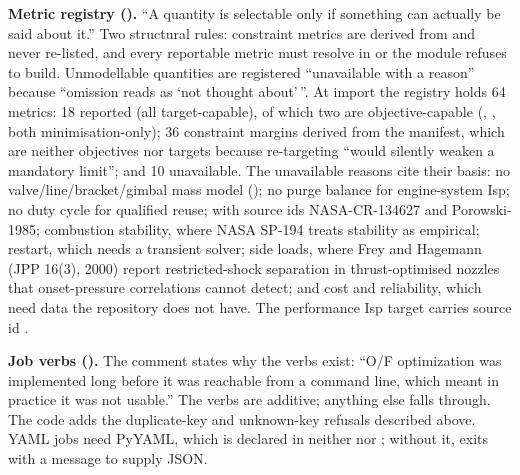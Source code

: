 \textbf{Metric registry ().} ``A quantity is selectable only if something can actually be said about it.'' Two structural rules: constraint metrics are derived from  and never re-listed, and every reportable metric must resolve in  or the module refuses to build. Unmodellable quantities are registered ``unavailable with a reason'' because ``omission reads as `not thought about'\,''. At import the registry holds 64 metrics: 18 reported (all target-capable), of which two are objective-capable (, , both minimisation-only); 36 constraint margins derived from the manifest, which are neither objectives nor targets because re-targeting ``would silently weaken a mandatory limit''; and 10 unavailable. The unavailable reasons cite their basis: no valve/line/bracket/gimbal mass model (); no purge balance for engine-system Isp; no duty cycle for qualified reuse;  with source ids NASA-CR-134627 and Porowski-1985; combustion stability, where NASA SP-194 treats stability as empirical; restart, which needs a transient solver; side loads, where Frey and Hagemann (JPP 16(3), 2000) report restricted-shock separation in thrust-optimised nozzles that onset-pressure correlations cannot detect; and cost and reliability, which need data the repository does not have. The performance Isp target carries source id .

\textbf{Job verbs ().} The comment states why the verbs exist: ``O/F optimization was implemented long before it was reachable from a command line, which meant in practice it was not usable.'' The verbs are additive; anything else falls through. The code adds the duplicate-key and unknown-key refusals described above. YAML jobs need PyYAML, which is declared in neither  nor ; without it,  exits with a message to supply JSON.


